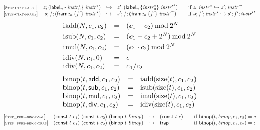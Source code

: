 \documentclass{article}
\begin{document}
$$
\begin{array}{@{}l@{}rcl@{}l@{}}
{[\textsc{\scriptsize Step{-}ctxt{-}label}]} \quad & z ; ({\mathsf{label}}_{n}\,\{ {{\mathit{instr}}_0^\ast} \}~{{\mathit{instr}}^\ast}) &\hookrightarrow& {z'} ; ({\mathsf{label}}_{n}\,\{ {{\mathit{instr}}_0^\ast} \}~{{\mathit{instr}'}^\ast})
  &\qquad \mbox{if}~z ; {{\mathit{instr}}^\ast} \hookrightarrow {z'} ; {{\mathit{instr}'}^\ast} \\
{[\textsc{\scriptsize Step{-}ctxt{-}frame}]} \quad & s ; f ; ({\mathsf{frame}}_{n}\,\{ {f'} \}~{{\mathit{instr}}^\ast}) &\hookrightarrow& {s'} ; f ; ({\mathsf{frame}}_{n}\,\{ {f'} \}~{{\mathit{instr}'}^\ast})
  &\qquad \mbox{if}~s ; {f'} ; {{\mathit{instr}}^\ast} \hookrightarrow {s'} ; {f'} ; {{\mathit{instr}'}^\ast} \\
\end{array}
$$
$$
\begin{array}{@{}lcl@{}l@{}}
{\mathrm{iadd}}(N, c_1, c_2) &=& (c_1 + c_2) \mathbin{\mathrm{mod}} {2^{N}} \\[0.8ex]
{\mathrm{isub}}(N, c_1, c_2) &=& (c_1 - c_2 + {2^{N}}) \mathbin{\mathrm{mod}} {2^{N}} \\[0.8ex]
{\mathrm{imul}}(N, c_1, c_2) &=& (c_1 \cdot c_2) \mathbin{\mathrm{mod}} {2^{N}} \\[0.8ex]
{\mathrm{idiv}}(N, c_1, 0) &=& \epsilon \\
{\mathrm{idiv}}(N, c_1, c_2) &=& c_1 / c_2 \\
\end{array}
$$
$$
\begin{array}{@{}lcl@{}l@{}}
{\mathrm{binop}}(t, \mathsf{add}, c_1, c_2) &=& {\mathrm{iadd}}({\mathrm{size}}(t), c_1, c_2) \\
{\mathrm{binop}}(t, \mathsf{sub}, c_1, c_2) &=& {\mathrm{isub}}({\mathrm{size}}(t), c_1, c_2) \\
{\mathrm{binop}}(t, \mathsf{mul}, c_1, c_2) &=& {\mathrm{imul}}({\mathrm{size}}(t), c_1, c_2) \\
{\mathrm{binop}}(t, \mathsf{div}, c_1, c_2) &=& {\mathrm{idiv}}({\mathrm{size}}(t), c_1, c_2) \\
\end{array}
$$
$$
\begin{array}{@{}l@{}rcl@{}l@{}}
{[\textsc{\scriptsize Step\_pure{-}binop{-}val}]} \quad & (\mathsf{const}~t~c_1)~(\mathsf{const}~t~c_2)~(\mathsf{binop}~t~{\mathit{binop}}) &\hookrightarrow& (\mathsf{const}~t~c)
  &\qquad \mbox{if}~{\mathrm{binop}}(t, {\mathit{binop}}, c_1, c_2) = c \\
{[\textsc{\scriptsize Step\_pure{-}binop{-}trap}]} \quad & (\mathsf{const}~t~c_1)~(\mathsf{const}~t~c_2)~(\mathsf{binop}~t~{\mathit{binop}}) &\hookrightarrow& \mathsf{trap}
  &\qquad \mbox{if}~{\mathrm{binop}}(t, {\mathit{binop}}, c_1, c_2) = \epsilon \\
\end{array}
$$
\end{document}
